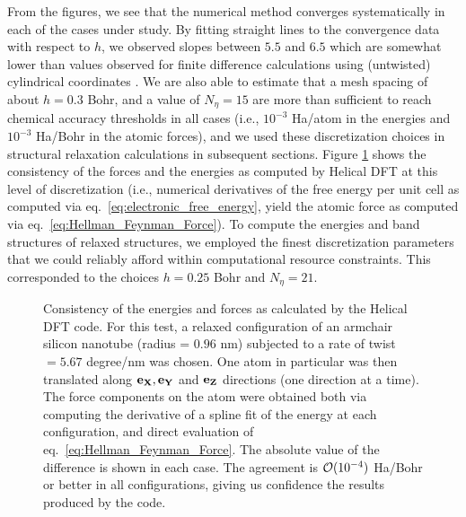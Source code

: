 \documentclass[preprint,12pt, 3p, sort&compress]{elsarticle}
\begin{document}
From the figures, we see that the numerical method converges systematically in each of the cases under study. By fitting straight lines to the convergence data with respect to $h$, we observed slopes between $5.5$ and $6.5$ which are somewhat lower than values observed for finite difference calculations using (untwisted) cylindrical coordinates \citep{ghosh2019symmetry}. We are also able to estimate that a mesh spacing of about $h = 0.3$ Bohr, and a value of $N_{\eta} = 15$ are more than sufficient to reach chemical accuracy thresholds in all cases (i.e., $10^{-3}$ Ha/atom in the energies and $10^{-3}$ Ha/Bohr in the atomic forces), and we used these discretization choices in structural relaxation calculations in subsequent sections. Figure \ref{fig:energy_force_consistency} shows the consistency of the forces and the energies as computed by Helical DFT at this level of discretization (i.e., numerical derivatives of the free energy per unit cell as computed via eq.~\ref{eq:electronic_free_energy}, yield the atomic force as computed via eq.~\ref{eq:Hellman_Feynman_Force}). To compute the energies and band structures of relaxed structures, we employed the finest discretization parameters that we could reliably afford within computational resource constraints. This corresponded to the choices $h=0.25$ Bohr and $N_{\eta} = 21$. 
\begin{figure}[ht]
\centering
{}
\caption{Consistency of the energies and forces as calculated by the Helical DFT code. For this test, a relaxed configuration of an armchair silicon nanotube (radius = $0.96$ nm) subjected to a rate of twist $= 5.67$ degree/nm was chosen. One atom in particular was then translated along ${\bf e}_{{\bf X}}, {\bf e}_{{\bf Y}}$ and ${\bf e}_{{\bf Z}}$ directions (one direction at a time). The force components on the atom were obtained both via computing the derivative of a spline fit of the energy at each configuration, and direct evaluation of eq.~\ref{eq:Hellman_Feynman_Force}. The absolute value of the difference is shown in each case. The agreement is ${\cal O}(10^{-4})$ Ha/Bohr or better in all configurations, giving us confidence the results produced by the code.}
\label{fig:energy_force_consistency}
\end{figure}
\end{document}
